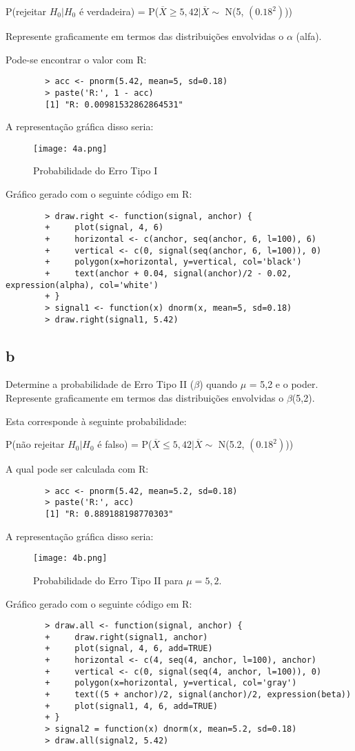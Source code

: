 \documentclass{article}[twocolumn]
\begin{document}
	P(rejeitar $H_0|H_0$ \'e verdadeira) = P($\overline{X} \geq 5,42 |
	\overline{X} \sim$ N(5, $(0.18^2)$))

	Represente graficamente em termos das distribuições envolvidas o $\alpha$ (alfa).	

	Pode-se encontrar o valor com R:
	\begin{verbatim}
		> acc <- pnorm(5.42, mean=5, sd=0.18)
		> paste('R:', 1 - acc)
		[1] "R: 0.00981532862864531"
	\end{verbatim}
	A representa\c{c}\~ao gr\'afica disso seria:
	\begin{figure}[H]
		\centering
		\texttt{[image: 4a.png]}
		\caption{Probabilidade do Erro Tipo I}
	\end{figure}
	Gr\'afico gerado com o seguinte c\'odigo em R:
	\begin{verbatim}
		> draw.right <- function(signal, anchor) {
		+     plot(signal, 4, 6)
		+     horizontal <- c(anchor, seq(anchor, 6, l=100), 6)
		+     vertical <- c(0, signal(seq(anchor, 6, l=100)), 0)
		+     polygon(x=horizontal, y=vertical, col='black')
		+     text(anchor + 0.04, signal(anchor)/2 - 0.02, expression(alpha), col='white')
		+ }
		> signal1 <- function(x) dnorm(x, mean=5, sd=0.18)
		> draw.right(signal1, 5.42)
	\end{verbatim}
	\subsection{b}
	Determine a probabilidade de Erro Tipo II ($\beta$) quando $\mu$ = 5,2 e o poder. Represente
	graficamente em termos das distribuições envolvidas o $\beta$(5,2).
	
	Esta corresponde \`a seguinte probabilidade:

	P(n\~ao rejeitar $H_0|H_0$ \'e falso) = P($\overline{X} \leq 5,42 |
	\overline{X} \sim$ N(5.2, $(0.18^2)$))

	A qual pode ser calculada com R:
	\begin{verbatim}
		> acc <- pnorm(5.42, mean=5.2, sd=0.18)
		> paste('R:', acc)
		[1] "R: 0.889188198770303"
	\end{verbatim}
	A representa\c{c}\~ao gr\'afica disso seria:
	\begin{figure}[H]
		\centering
		\texttt{[image: 4b.png]}
		\caption{Probabilidade do Erro Tipo II para $\mu = 5,2$.}
	\end{figure}
	Gr\'afico gerado com o seguinte c\'odigo em R:
	\begin{verbatim}
		> draw.all <- function(signal, anchor) {
		+     draw.right(signal1, anchor)
		+     plot(signal, 4, 6, add=TRUE)
		+     horizontal <- c(4, seq(4, anchor, l=100), anchor)
		+     vertical <- c(0, signal(seq(4, anchor, l=100)), 0)
		+     polygon(x=horizontal, y=vertical, col='gray')
		+     text((5 + anchor)/2, signal(anchor)/2, expression(beta))
		+     plot(signal1, 4, 6, add=TRUE)
		+ }
		> signal2 = function(x) dnorm(x, mean=5.2, sd=0.18)
		> draw.all(signal2, 5.42)
	\end{verbatim}
\end{document}
